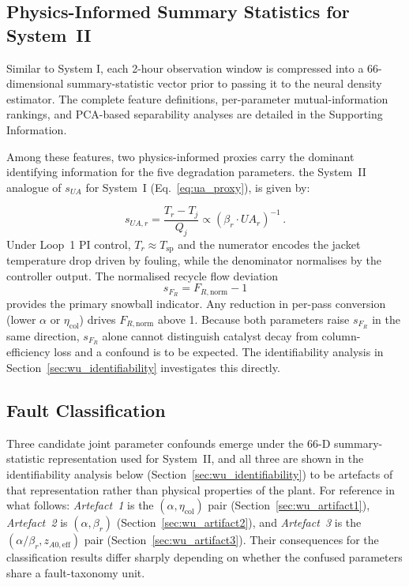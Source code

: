 \documentclass[aps,pre,twocolumn,superscriptaddress]{revtex4-2}
\begin{document}
\subsection{Physics-Informed Summary Statistics for System~II}
\label{sec:wu_summary_stats}

Similar to System I, each 2-hour observation window is compressed into
a 66-dimensional summary-statistic vector prior to passing it to the neural
density estimator. The complete feature definitions, per-parameter 
mutual-information rankings, and PCA-based separability analyses are detailed
in the Supporting Information.

Among these features, two physics-informed proxies carry the dominant identifying
information for the five degradation parameters. the System~II analogue of $s_{U\!A}$ for System~I (Eq.~\eqref{eq:ua_proxy}), is given by:

\begin{equation}
  s_{UA,r} = \frac{T_r - T_j}{Q_j} \propto (\beta_r\!\cdot\!U\!A_r)^{-1} \, .
  \label{eq:wu_ua_proxy}
\end{equation}
%
Under Loop~1 PI control,
$T_r \approx T_\mathrm{sp}$ and the numerator encodes the jacket temperature
drop driven by fouling, while the denominator normalises by the controller
output.  The normalised recycle flow deviation
%
\begin{equation}
  s_{F_R} = F_{R,\mathrm{norm}} - 1
  \label{eq:wu_fr_proxy}
\end{equation}
%
provides the primary snowball indicator. Any reduction in per-pass conversion (lower $\alpha$ or $\eta_\mathrm{col}$) drives $F_{R,\mathrm{norm}}$ above 1.
Because both parameters raise $s_{F_R}$ in the same direction, $s_{F_R}$ alone cannot distinguish catalyst decay from column-efficiency loss and a confound is to be expected. The identifiability analysis in Section~\ref{sec:wu_identifiability} investigates this directly.

\subsection{Fault Classification}
\label{sec:wu_fault_class}

Three candidate joint parameter confounds emerge under the 66-D
summary-statistic representation used for System~II, and all three
are shown in the identifiability analysis below
(Section~\ref{sec:wu_identifiability}) to be artefacts of that representation
rather than physical properties of the plant. For reference in what follows:
\emph{Artefact~1} is the $(\alpha,\eta_\mathrm{col})$ pair
(Section~\ref{sec:wu_artifact1}), \emph{Artefact~2} is $(\alpha,\beta_r)$
(Section~\ref{sec:wu_artifact2}), and \emph{Artefact~3} is the
$(\alpha/\beta_r, z_{A0,\mathrm{eff}})$ pair (Section~\ref{sec:wu_artifact3}).
Their consequences for the classification results differ sharply
depending on whether the confused parameters share a fault-taxonomy unit.
\end{document}
